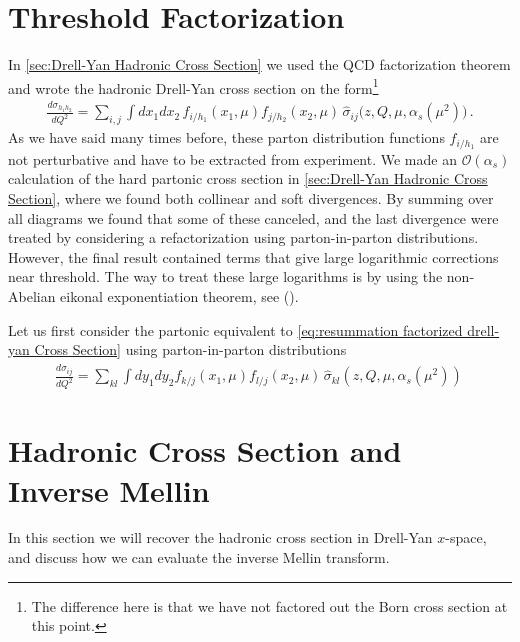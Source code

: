 \section{Threshold Factorization}
In \cref{sec:Drell-Yan Hadronic Cross Section} we used the QCD factorization theorem and wrote the hadronic Drell-Yan cross section on the form\footnote{The difference here is that we have not factored out the Born cross section at this point.}
\begin{align}\label{eq:resummation factorized drell-yan Cross Section}
   \frac{ d\sigma_{h_1h_2}}{dQ^{2}}=\sum_{i,j}\int dx_{1}dx_{2}\,f_{i/h_1}(x_1,\mu)f_{j/h_2}(x_2,\mu)\,\hat{\sigma}_{ij}\Big(z,Q,\mu,\alpha_s(\mu^{2})\Big)\,.
\end{align}
As we have said many times before, these parton distribution functions $f_{i/h_{1}}$ are not perturbative and have to be extracted from experiment. We made an $\mathcal{O}(\alpha_s)$ calculation of the hard partonic cross section in \cref{sec:Drell-Yan Hadronic Cross Section}, where we found both collinear and soft divergences. By summing over all diagrams we found that some of these canceled, and the last divergence were treated by considering a refactorization using parton-in-parton distributions. However, the final result contained terms that give large logarithmic corrections near threshold. The way to treat these large logarithms is by using the non-Abelian eikonal exponentiation theorem, see (). 

Let us first consider the partonic equivalent to \cref{eq:resummation factorized drell-yan Cross Section} using parton-in-parton distributions
\begin{align}
    \frac{d\hat{\sigma}_{ij}}{dQ^{2}}=\sum_{kl}\int dy_{1}dy_{2}f_{k/j}(x_1,\mu)f_{l/j}(x_2,\mu)\,\hat{\sigma}_{kl}(z,Q,\mu,\alpha_s(\mu^{2}))\,
\end{align}

\section{Hadronic Cross Section and Inverse Mellin}
In this section we will recover the hadronic cross section in Drell-Yan $x$-space, and discuss how we can evaluate the inverse Mellin transform. 

